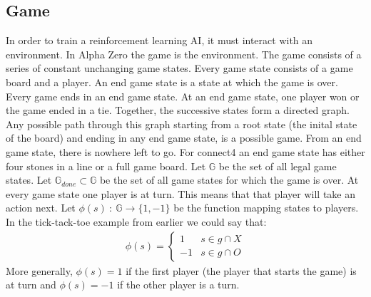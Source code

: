 \documentclass[12pt]{article}
\begin{document}
\subsection{Game}
In order to train a reinforcement learning AI, it must interact with an environment. In Alpha Zero the game is the environment. The game consists of a series of constant unchanging game states. Every game state consists of a game board and a player. An end game state is a state at which the game is over. Every game ends in an end game state. At an end game state, one player won or the game ended in a tie. Together, the successive states form a directed graph. Any possible path through this graph starting from a root state (the inital state of the board) and ending in any end game state, is a possible game. From an end game state, there is nowhere left to go.
For connect4 an end game state has either four stones in a line or a full game board.
Let \(\mathbb{G}\) be the set of all legal game states.
Let \(\mathbb{G}_{done} \subset \mathbb G\) be the set of all game states for which the game is over. At every game state one player is at turn. This means that that player will take an action next. Let \(\phi(s)~:~\mathbb{G}\to\{1,-1\}\) be the function mapping states to players. In the tick-tack-toe example from earlier we could say that:
\begin{align}
\phi(s) = \left\{\begin{matrix}
1 & s \in g\cap X\\
-1 & s \in g\cap O
\end{matrix}\right.
\end{align}
More generally, \(\phi(s) = 1\) if the first player (the player that starts the game) is at turn and \(\phi(s) = -1\) if the other player is a turn.
\end{document}
